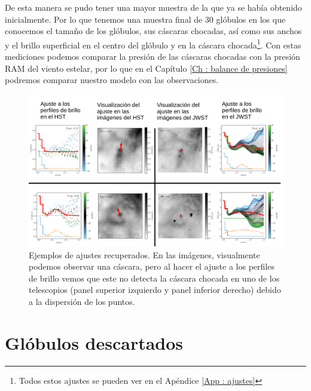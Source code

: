 \documentclass{book}
\begin{document}
De esta manera se pudo tener una mayor muestra de la que ya se había
obtenido inicialmente. Por lo que tenemos una muestra final de 30
glóbulos en los que conocemos el tamaño de los glóbulos, sus cáscaras
chocadas, así como sus anchos y el brillo superficial en el centro del
glóbulo y en la cáscara chocada\footnote{Todos estos ajustes se pueden
  ver en el Apéndice \ref{App : ajustes}}. Con estas mediciones
podemos comparar la presión de las cáscaras chocadas con la presión
RAM del viento estelar, por lo que en el Capítulo \ref{Ch : balance de
  presiones} podremos comparar nuestro modelo con las observaciones.

\begin{figure}[htb]
    \centering
    \includegraphics[width=\textwidth]{imagenes_corregidas/recuperados_aj.pdf}
    \caption{Ejemplos de ajustes recuperados. En las imágenes,
      visualmente podemos observar una cáscara, pero al hacer el
      ajuste a los perfiles de brillo vemos que este no detecta la
      cáscara chocada en uno de los telescopios (panel superior
      izquierdo y panel inferior derecho) debido a la dispersión de
      los puntos.}
    \label{Recuperados Globulos}
\end{figure}

\section{Glóbulos descartados}\label{Bad globules}
\end{document}
